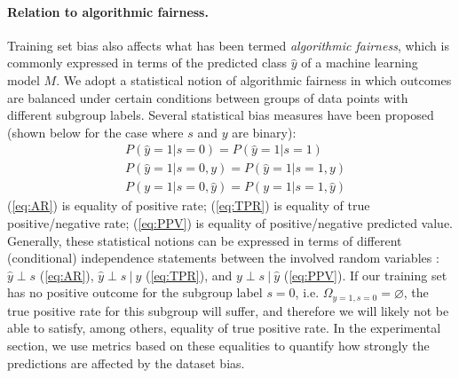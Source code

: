 \paragraph{Relation to algorithmic fairness.}
Training set bias also affects what has been termed \emph{algorithmic fairness},
which is commonly expressed in terms of the predicted class $\hat{y}$ of a machine learning model $M$.
We adopt a statistical notion of algorithmic fairness in which outcomes are balanced under certain conditions between groups of data points with different subgroup labels.
%
%
Several statistical bias measures have been proposed
\citep{kamiran2012data,hardt2016equality,zafar2017fairnesstreatment,chouldechova2017fair,RagBarKleLev20}
(shown below for the case where $s$ and $y$ are binary):
\begin{align}
& P(\hat{y}=1|s=0)=P(\hat{y}=1|s=1)\label{eq:AR}\\
& P(\hat{y}=1|s=0,y)=P(\hat{y}=1|s=1,y) \label{eq:TPR} \\
& P(y=1|s=0,\hat{y})=P(y=1|s=1,\hat{y}) \label{eq:PPV}
\end{align}
(\ref{eq:AR}) is equality of positive rate; (\ref{eq:TPR}) is equality of true positive/negative rate; (\ref{eq:PPV}) is equality of positive/negative predicted value.
Generally, these statistical notions can be expressed in terms of different (conditional) independence statements between the involved random variables \citep{BarHarNar19}:
$\hat{y}\perp s$ (\eqref{eq:AR}), $\hat{y}\perp s\ |\ y$ (\eqref{eq:TPR}), and $y\perp s\ |\ \hat{y}$ (\eqref{eq:PPV}).
If our training set has no positive outcome for the subgroup label $s=0$, i.e. $\Omega_{y=1,s=0} = \varnothing$, the true positive rate for this subgroup will suffer, and therefore we will likely not be able to satisfy, among others, equality of true positive rate.
In the experimental section, we use metrics based on these equalities to quantify how strongly the predictions are affected by the dataset bias.

